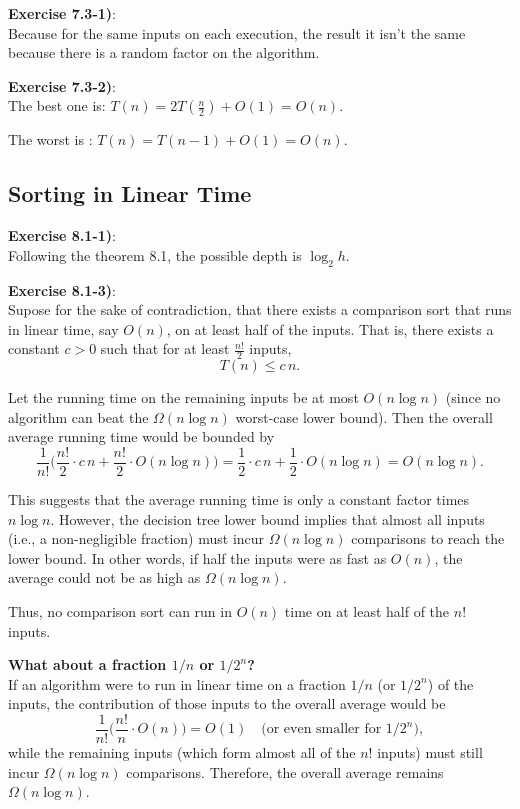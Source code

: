 \documentclass{article}
\newcounter{exercise}[section]   %
\begin{document}
\textbf{Exercise 7.3-1)}:\\
Because for the same inputs on each execution, the result it isn't the same because there is
a random factor on the algorithm. 

\textbf{Exercise 7.3-2)}:\\
The best one is: \(T(n) = 2T(\frac{n}{2}) + O(1) = O(n)\).

The worst is : \(T(n) = T(n - 1) + O(1) = O(n)\).

\subsection{Sorting in Linear Time}
\setcounter{exercise}{0}

\textbf{Exercise 8.1-1)}:\\
Following the theorem 8.1, the possible depth is \(\log_2 h\).

\textbf{Exercise 8.1-3)}:\\
Supose for the sake of contradiction, that there exists a comparison
sort that runs in linear time, say \(O(n)\), on at least half of the inputs.
That is, there exists a constant \(c>0\) such that for at least
\(\frac{n!}{2}\) inputs,
\[
T(n) \le c\, n.
\]

Let the running time on the remaining inputs be at most \(O(n\log n)\)
(since no algorithm can beat the \(\Omega(n\log n)\) worst-case lower bound).
Then the overall average running time would be bounded by
\[
\frac{1}{n!}\Biggl(\frac{n!}{2}\cdot c\, n + \frac{n!}{2}\cdot O(n\log n)\Biggr)
=\frac{1}{2}\cdot c\, n+\frac{1}{2}\cdot O(n\log n)=O(n\log n).
\]

This suggests that the average running time is only a constant factor
times \(n\log n\). However, the decision tree lower bound implies that almost
all inputs (i.e., a non-negligible fraction) must incur \(\Omega(n\log n)\)
comparisons to reach the lower bound. In other words, if half the inputs were as
fast as \(O(n)\), the average could not be as high as \(\Omega(n\log n)\).

Thus, no comparison sort can run in \(O(n)\) time on at least half of the
\(n!\) inputs.

\textbf{What about a fraction \(1/n\) or \(1/2^n\)?}\\[1mm]
If an algorithm were to run in linear time on a fraction \(1/n\) (or \(1/2^n\))
of the inputs, the contribution of those inputs to the overall average would be
\[
\frac{1}{n!}\Biggl(\frac{n!}{n}\cdot O(n)\Biggr)=O(1)
\quad \text{(or even smaller for }1/2^n\text{)},
\]
while the remaining inputs (which form almost all of the \(n!\) inputs) must
still incur \(\Omega(n\log n)\) comparisons. Therefore, the overall average 
remains \(\Omega(n\log n)\).
\end{document}
